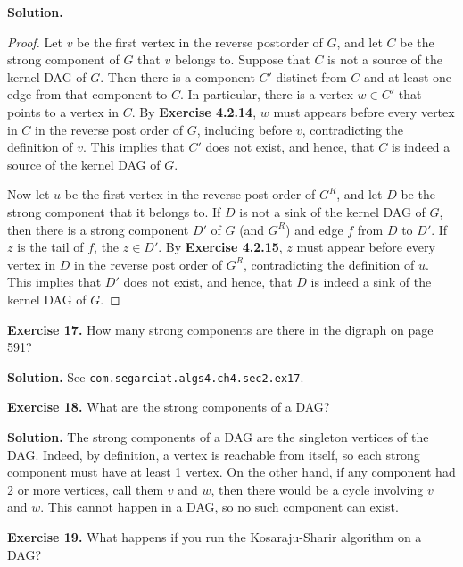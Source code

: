 \documentclass[12pt, a4paper]{article}
\newenvironment{ex}[2][Exercise]
{\par\medskip\noindent \textbf{#1 #2.}}
{\medskip}
\newenvironment{sol}[1][Solution]
{\par\medskip\noindent \textbf{#1.} }
{\medskip}
\begin{document}
	\begin{sol}
		\begin{proof}
			Let $v$ be the first vertex in the reverse postorder of $G$, and let
			$C$ be the strong component of $G$ that $v$ belongs to. Suppose that $C$
			is not a source of the kernel DAG of $G$. Then there is a component $C'$
			distinct from $C$ and at least one edge from that component to $C$.
			In particular, there is a vertex $w\in C'$ that points to a vertex in $C$.
			By \textbf{Exercise 4.2.14}, $w$ must appears before every vertex in $C$
			in the reverse post order of $G$, including before $v$, contradicting the
			definition of $v$. This implies that $C'$ does not exist, and hence,
			that $C$ is indeed a source of the kernel DAG of $G$.
			
			Now let $u$ be the first vertex in the reverse post order of $G^R$,
			and let $D$ be the strong component that it belongs to. If $D$ is
			not a sink of the kernel DAG of $G$, then there is a strong component
			$D'$ of $G$ (and $G^R$) and edge $f$ from $D$ to $D'$. If $z$
			is the tail of $f$, the $z\in D'$. By \textbf{Exercise 4.2.15},
			$z$ must appear before every vertex in $D$ in the reverse post order
			of $G^R$, contradicting the definition of $u$. This implies that
			$D'$ does not exist, and hence, that $D$ is indeed a sink of the
			kernel DAG of $G$.
		\end{proof}
	\end{sol}
	\begin{ex}{17}
		How many strong components are there in the digraph on page 591?
	\end{ex}
	\begin{sol}
		See \texttt{com.segarciat.algs4.ch4.sec2.ex17}.
	\end{sol}
	\begin{ex}{18}
		What are the strong components of a DAG?
	\end{ex}
	\begin{sol}
		The strong components of a DAG are the singleton vertices of the DAG.
		Indeed, by definition, a vertex is reachable from itself, so each
		strong component must have at least 1 vertex. On the other hand, if
		any component had 2 or more vertices, call them $v$ and $w$, then
		there would be a cycle involving $v$ and $w$. This cannot happen
		in a DAG, so no such component can exist.
	\end{sol}
	\begin{ex}{19}
		What happens if you run the Kosaraju-Sharir algorithm on a DAG?
	\end{ex}
\end{document}
